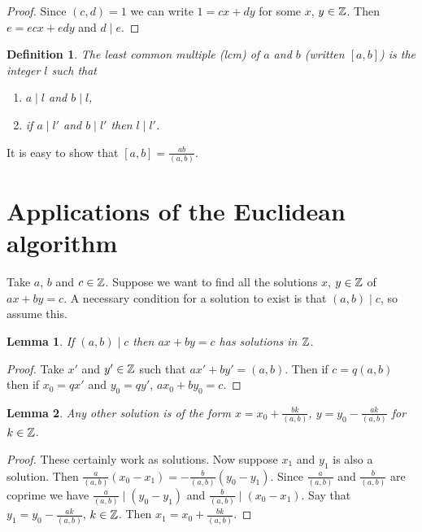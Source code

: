 \documentclass{notes}
\theoremstyle{plain}
\newtheorem*{definition}{Definition}
\newtheorem{lemma}{Lemma}[chapter]
\begin{document}
\begin{proof}
Since $(c,d) = 1$ we can write $1 = cx + dy$ for some $x$, $y \in \mathbb{Z}$.
Then $e = ecx + edy$ and $d \mid e$.
\end{proof}

\begin{definition}
The least common multiple (lcm) of $a$ and $b$ (written $[a,b]$) is the
integer $l$ such that
\begin{enumerate}
\item $a \mid l$ and $b \mid l$,
\item if $a \mid l'$ and $b \mid l'$ then $l \mid l'$.
\end{enumerate}
\end{definition}

It is easy to show that $[a,b] = \frac{ab}{(a,b)}$.

\section{Applications of the Euclidean algorithm}

Take $a$, $b$ and $c \in \mathbb{Z}$.  Suppose we want to find all the solutions
$x$, $y \in \mathbb{Z}$ of $a x + b y = c$.  A necessary condition for a solution
to exist is that $(a,b) \mid c$, so assume this.

\begin{lemma}\label{L:axbyexist}
If $(a,b) \mid c$ then $a x + b y = c$ has solutions in $\mathbb{Z}$.
\end{lemma}

\begin{proof}
Take $x'$ and $y' \in \mathbb{Z}$ such that  $a x' + b y' = (a,b)$.  Then if
$c = q (a,b)$ then if $x_0 = q x'$ and $y_0 = q y'$, $a x_0 + b y_0 = c$.
\end{proof}

\begin{lemma}\label{L:axbyuniq}
Any other solution is of the form $x = x_0 + \frac{b k}{(a,b)}$,
$y = y_0 - \frac{a k}{(a,b)}$ for $k \in \mathbb{Z}$.
\end{lemma}

\begin{proof}
These certainly work as solutions.  Now suppose $x_1$ and $y_1$ is also
a solution.  Then $\frac{a}{(a,b)}(x_0 - x_1) = -\frac{b}{(a,b)}(y_0 - y_1)$.
Since $\frac{a}{(a,b)}$ and $\frac{b}{(a,b)}$ are coprime we have
$\frac{a}{(a,b)} \mid (y_0 - y_1)$ and $\frac{b}{(a,b)} \mid (x_0 - x_1)$.
Say that $y_1 = y_0 - \frac{a k}{(a,b)}$, $k \in \mathbb{Z}$.  Then
$x_1 = x_0 + \frac{b k}{(a,b)}$.
\end{proof}
\end{document}
